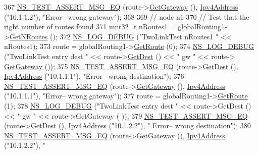 \begin{DoxyCode}
367   \hyperlink{group__testing_ga2a9d78cffb3db8e867c35fff0b698cf5}{NS\_TEST\_ASSERT\_MSG\_EQ} (route->\hyperlink{classns3_1_1Ipv4RoutingTableEntry_a49dda51e0ba3c78bc969a9378bd15893}{GetGateway} (), 
      \hyperlink{classns3_1_1Ipv4Address}{Ipv4Address} (\textcolor{stringliteral}{"10.1.1.2"}), \textcolor{stringliteral}{"Error-- wrong gateway"});
368 
369   \textcolor{comment}{// node n1}
370   \textcolor{comment}{// Test that the right number of routes found}
371   uint32\_t nRoutes1 = globalRouting1->\hyperlink{classns3_1_1Ipv4GlobalRouting_abb9d2b3642272b9bd2697a5699922fa7}{GetNRoutes} ();
372   \hyperlink{group__logging_ga413f1886406d49f59a6a0a89b77b4d0a}{NS\_LOG\_DEBUG} (\textcolor{stringliteral}{"TwoLinkTest nRoutes1 "} << nRoutes1);
373   route = globalRouting1->\hyperlink{classns3_1_1Ipv4GlobalRouting_accd518b9888908dbea189c1d1c73dcf1}{GetRoute} (0);
374   \hyperlink{group__logging_ga413f1886406d49f59a6a0a89b77b4d0a}{NS\_LOG\_DEBUG} (\textcolor{stringliteral}{"TwoLinkTest entry dest "} << route->\hyperlink{classns3_1_1Ipv4RoutingTableEntry_adcd2084c5f0261c43c059c2b981e91fa}{GetDest} () << \textcolor{stringliteral}{" gw "} << route->
      \hyperlink{classns3_1_1Ipv4RoutingTableEntry_a49dda51e0ba3c78bc969a9378bd15893}{GetGateway} ());
375   \hyperlink{group__testing_ga2a9d78cffb3db8e867c35fff0b698cf5}{NS\_TEST\_ASSERT\_MSG\_EQ} (route->\hyperlink{classns3_1_1Ipv4RoutingTableEntry_adcd2084c5f0261c43c059c2b981e91fa}{GetDest} (), 
      \hyperlink{classns3_1_1Ipv4Address}{Ipv4Address} (\textcolor{stringliteral}{"10.1.1.1"}), \textcolor{stringliteral}{"Error-- wrong destination"});
376   \hyperlink{group__testing_ga2a9d78cffb3db8e867c35fff0b698cf5}{NS\_TEST\_ASSERT\_MSG\_EQ} (route->\hyperlink{classns3_1_1Ipv4RoutingTableEntry_a49dda51e0ba3c78bc969a9378bd15893}{GetGateway} (), 
      \hyperlink{classns3_1_1Ipv4Address}{Ipv4Address} (\textcolor{stringliteral}{"10.1.1.1"}), \textcolor{stringliteral}{"Error-- wrong gateway"});
377   route = globalRouting1->\hyperlink{classns3_1_1Ipv4GlobalRouting_accd518b9888908dbea189c1d1c73dcf1}{GetRoute} (1);
378   \hyperlink{group__logging_ga413f1886406d49f59a6a0a89b77b4d0a}{NS\_LOG\_DEBUG} (\textcolor{stringliteral}{"TwoLinkTest entry dest "} << route->GetDest () << \textcolor{stringliteral}{" gw "} << route->GetGateway (
      ));
379   \hyperlink{group__testing_ga2a9d78cffb3db8e867c35fff0b698cf5}{NS\_TEST\_ASSERT\_MSG\_EQ} (route->GetDest (), \hyperlink{classns3_1_1Ipv4Address}{Ipv4Address} (\textcolor{stringliteral}{"10.1.2.2"}), \textcolor{stringliteral}{"
      Error-- wrong destination"});
380   \hyperlink{group__testing_ga2a9d78cffb3db8e867c35fff0b698cf5}{NS\_TEST\_ASSERT\_MSG\_EQ} (route->GetGateway (), \hyperlink{classns3_1_1Ipv4Address}{Ipv4Address} (\textcolor{stringliteral}{"10.1.2.2"}), \textcolor{stringliteral}{"
}
\end{DoxyCode}
